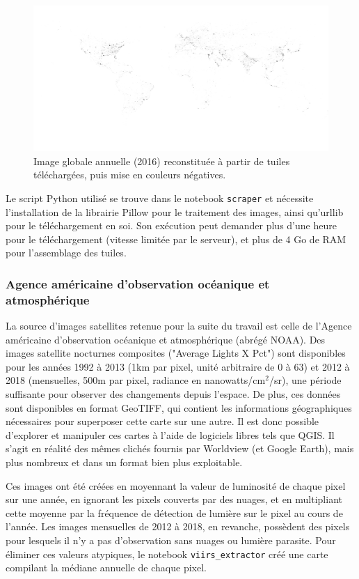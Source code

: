 \documentclass[a4paper, 11pt]{report}
\begin{document}
\begin{figure}
	\centering
	\includegraphics[width=0.8\paperheight, angle=-90, origin=c]{img/tiles_2016_zoom6.png}
	\caption{Image globale annuelle (2016) reconstituée à partir de tuiles téléchargées, puis mise en couleurs négatives.}
	\label{nasa-worldview-tiles}
\end{figure}

Le script Python utilisé se trouve dans le notebook \texttt{scraper} et nécessite l'installation de la librairie Pillow pour le traitement des images, ainsi qu'urllib pour le téléchargement en soi. Son exécution peut demander plus d'une heure pour le téléchargement (vitesse limitée par le serveur), et plus de 4 Go de RAM pour l'assemblage des tuiles.

\subsubsection{Agence américaine d'observation océanique et atmosphérique}
La source d'images satellites retenue pour la suite du travail est celle de l'Agence américaine d'observation océanique et atmosphérique (abrégé NOAA). Des images satellite nocturnes composites ("Average Lights X Pct") sont disponibles pour les années 1992 à 2013 \cite{noaa} (1km par pixel, unité arbitraire de 0 à 63) et 2012 à 2018 \cite{noaa-viirs} (mensuelles, 500m par pixel, radiance en nanowatts/cm$^2$/sr), une période suffisante pour observer des changements depuis l'espace. De plus, ces données sont disponibles en format GeoTIFF, qui contient les informations géographiques nécessaires pour superposer cette carte sur une autre. Il est donc possible d'explorer et manipuler ces cartes à l'aide de logiciels libres tels que QGIS. Il s'agit en réalité des mêmes clichés fournis par Worldview (et Google Earth), mais plus nombreux et dans un format bien plus exploitable.

Ces images ont été créées en moyennant la valeur de luminosité de chaque pixel sur une année, en ignorant les pixels couverts par des nuages, et en multipliant cette moyenne par la fréquence de détection de lumière sur le pixel au cours de l'année. Les images mensuelles de 2012 à 2018, en revanche, possèdent des pixels pour lesquels il n'y a pas d'observation sans nuages ou lumière parasite. Pour éliminer ces valeurs atypiques, le notebook \texttt{viirs\_extractor} créé une carte compilant la médiane annuelle de chaque pixel.
\end{document}
